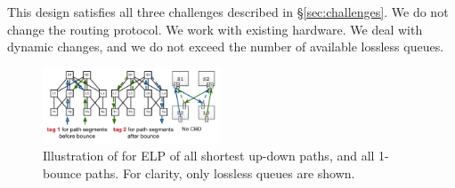
This design satisfies all three challenges described in \S\ref{sec:challenges}.
We do not change the routing protocol. We work with existing hardware. We deal
with dynamic changes, and we do not exceed the number of available
lossless queues.

\begin{figure}[t]
	\centering
	\includegraphics[width=0.47\textwidth] {figs/cbd_b}
	\caption{Illustration of \sysname{} for ELP of all shortest up-down paths,
		and all 1-bounce paths. For clarity, only lossless queues are shown.}
	\label{fig:clos_tagger}
\end{figure}

